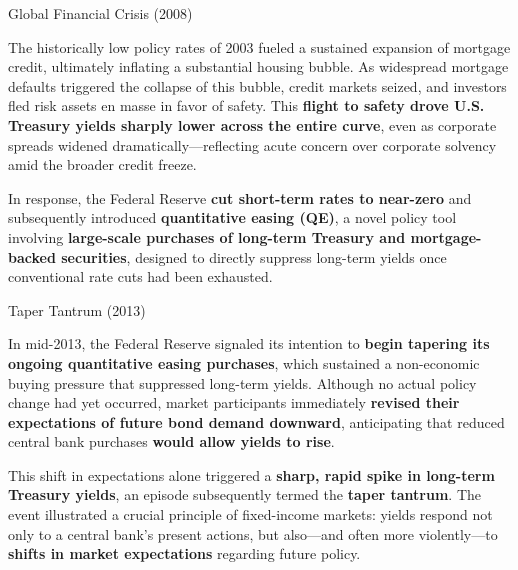 \documentclass[10pt]{article}
\begin{document}
    \begin{core}{Global Financial Crisis (2008)}

      The historically low policy rates of 2003 fueled a sustained expansion of mortgage credit, ultimately inflating a substantial housing bubble. As widespread mortgage defaults triggered the collapse of this bubble, credit markets seized, and investors fled risk assets en masse in favor of safety. This \textbf{flight to safety drove U.S. Treasury yields sharply lower across the entire curve}, even as corporate spreads widened dramatically---reflecting acute concern over corporate solvency amid the broader credit freeze.


      In response, the Federal Reserve \textbf{cut short-term rates to near-zero} and subsequently introduced \textbf{quantitative easing (QE)}, a novel policy tool involving \textbf{large-scale purchases of long-term Treasury and mortgage-backed securities}, designed to directly suppress long-term yields once conventional rate cuts had been exhausted.

    \end{core}

    \begin{core}{Taper Tantrum (2013)}

      In mid-2013, the Federal Reserve signaled its intention to \textbf{begin tapering its ongoing quantitative easing purchases}, which sustained a non-economic buying pressure that suppressed long-term yields. Although no actual policy change had yet occurred, market participants immediately \textbf{revised their expectations of future bond demand downward}, anticipating that reduced central bank purchases \textbf{would allow yields to rise}.


      This shift in expectations alone triggered a \textbf{sharp, rapid spike in long-term Treasury yields}, an episode subsequently termed the \textbf{taper tantrum}. The event illustrated a crucial principle of fixed-income markets: yields respond not only to a central bank's present actions, but also---and often more violently---to \textbf{shifts in market expectations} regarding future policy.

    \end{core}
\end{document}
